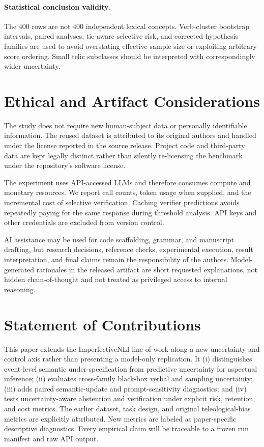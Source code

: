\documentclass[letterpaper]{article}
\begin{document}
\paragraph{Statistical conclusion validity.} The 400 rows are not 400 independent lexical concepts. Verb-cluster bootstrap intervals, paired analyses, tie-aware selective risk, and corrected hypothesis families are used to avoid overstating effective sample size or exploiting arbitrary score ordering. Small telic subclasses should be interpreted with correspondingly wider uncertainty.

\section{Ethical and Artifact Considerations}
The study does not require new human-subject data or personally identifiable information. The reused dataset is attributed to its original authors and handled under the license reported in the source release. Project code and third-party data are kept legally distinct rather than silently re-licensing the benchmark under the repository's software license.

The experiment uses API-accessed LLMs and therefore consumes compute and monetary resources. We report call counts, token usage when supplied, and the incremental cost of selective verification. Caching verifier predictions avoids repeatedly paying for the same response during threshold analysis. API keys and other credentials are excluded from version control.

AI assistance may be used for code scaffolding, grammar, and manuscript drafting, but research decisions, reference checks, experimental execution, result interpretation, and final claims remain the responsibility of the authors. Model-generated rationales in the released artifact are short requested explanations, not hidden chain-of-thought and not treated as privileged access to internal reasoning.

\section{Statement of Contributions}
This paper extends the ImperfectiveNLI line of work along a new uncertainty and control axis rather than presenting a model-only replication. It (i) distinguishes event-level semantic under-specification from predictive uncertainty for aspectual inference; (ii) evaluates cross-family black-box verbal and sampling uncertainty; (iii) adds paired semantic-update and prompt-sensitivity diagnostics; and (iv) tests uncertainty-aware abstention and verification under explicit risk, retention, and cost metrics. The earlier dataset, task design, and original teleological-bias metrics are explicitly attributed. New metrics are labeled as paper-specific descriptive diagnostics. Every empirical claim will be traceable to a frozen run manifest and raw API output.
\end{document}
